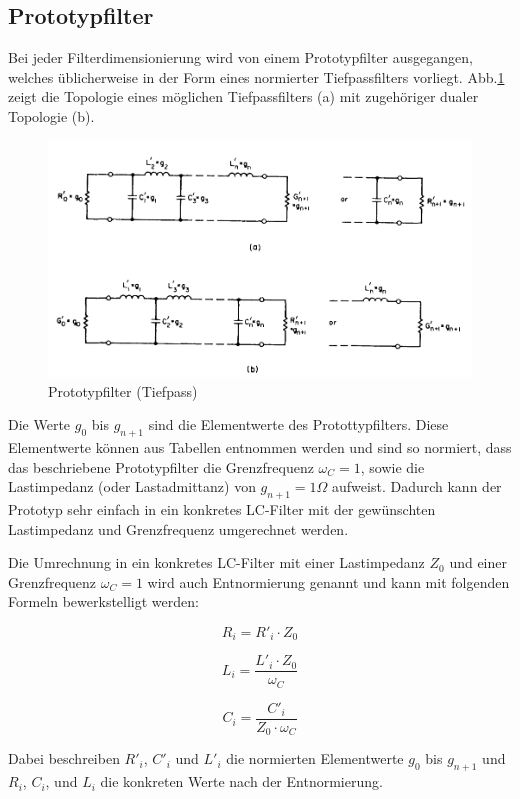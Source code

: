 \subsection{Prototypfilter}
\label{sec:Protototypfilter}

Bei jeder Filterdimensionierung wird von einem Prototypfilter ausgegangen, welches üblicherweise in der Form eines normierter Tiefpassfilters vorliegt. Abb.\ref{fig:Prototyp_Filter} zeigt die Topologie eines möglichen Tiefpassfilters (a) mit zugehöriger dualer Topologie (b).

\begin{figure}[h!]
\centering
 	\includegraphics[width=\imagewidth]{images/Prototyp_Filter}
 	\caption{Prototypfilter (Tiefpass)}
 	\label{fig:Prototyp_Filter}
\end{figure}


Die Werte $g_0$ bis $g_{n+1}$ sind die Elementwerte des Protottypfilters. Diese Elementwerte können aus Tabellen entnommen werden und sind so normiert, dass das beschriebene  Prototypfilter die Grenzfrequenz $\omega_{C} = 1$, sowie die Lastimpedanz (oder Lastadmittanz) von $g_{n+1}=1\Omega$ aufweist. Dadurch kann der Prototyp sehr einfach in ein konkretes LC-Filter mit der gewünschten Lastimpedanz und Grenzfrequenz umgerechnet werden. 

Die Umrechnung in ein konkretes LC-Filter mit einer Lastimpedanz $Z_0$ und einer Grenzfrequenz $\omega_{C} = 1$ wird auch Entnormierung genannt und kann mit folgenden Formeln bewerkstelligt werden: 

\begin{equation}\label{eq:R}	
R_i = R'_i \cdot Z_0
\end{equation}

\begin{equation}\label{eq:L}	
L_i = \frac{L'_i \cdot Z_0}{\omega_{C}}
\end{equation}

\begin{equation}\label{eq:C}	
C_i = \frac{C'_i}{Z_0 \cdot \omega_{C}}
\end{equation}

Dabei beschreiben  $R'_i$, $C'_i$ und $L'_i$ die normierten Elementwerte  $g_0$ bis $g_{n+1}$ und $R_i$, $C_i$, und $L_i$ die konkreten Werte nach der Entnormierung.

